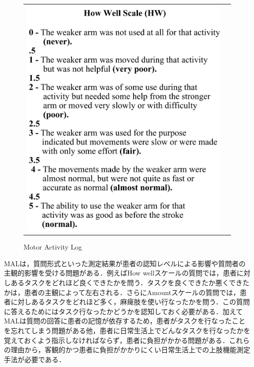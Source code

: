 \begin{figure}[H]
\begin{center}
\begin{tabular}{cc}
{\includegraphics[scale=0.3]{fig/ch1/how}
} \\
\end{tabular}
\end{center}
   \caption{Motor Activity Log\cite{Taub2006}}
\label{fig:Motor Activity Log}
\end{figure}

MALは，質問形式といった測定結果が患者の認知レベルによる影響や質問者の主観的影響を受ける問題がある．例えばHow wellスケールの質問では，患者に対しあるタスクをどれほど良くできたかを問う．タスクを良くできたか悪くできたかは，患者の主観によって左右される．さらにAmountスケールの質問では，患者に対しあるタスクをどれほど多く，麻痺肢を使い行なったかを問う．この質問に答えるためにはタスク行なったかどうかを認知しておく必要がある．加えてMALは質問の回答に患者の記憶が依存するため，患者がタスクを行なったことを忘れてしまう問題がある他，患者に日常生活上でどんなタスクを行なったかを覚えておくよう指示しなければならず，患者に負担がかかる問題がある．これらの理由から，客観的かつ患者に負担がかかりにくい日常生活上での上肢機能測定手法が必要である．

